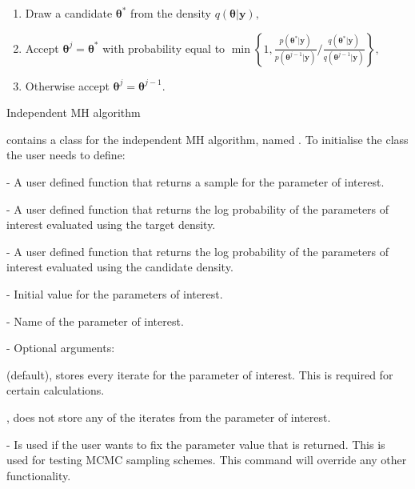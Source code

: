 \documentclass[article]{jss}
\begin{document}
%
\begin{algorithm}[H]
\begin{enumerate}
\item Draw a candidate $\bm{\bm{\theta}}^{\ast}$ from the density $q\left(\bm{\bm{\theta}}|\bm{y}\right),$ 
\item Accept $\bm{\theta}^{j}=\bm{\theta}^{\ast}$ with probability equal
to $\min\left\{ 1,\frac{p\left(\bm{\theta}^{\ast}|\bm{y}\right)}{p\left(\bm{\theta}^{j-1}|\bm{y}\right)}/\frac{q\left(\bm{\theta}^{\ast}|\bm{y}\right)}{q\left(\bm{\theta}^{j-1}|\bm{y}\right)}\right\} ,$ 
\item Otherwise accept $\bm{\theta}^{j}=\bm{\theta}^{j-1}.$ 
\end{enumerate}
\caption{Independent MH algorithm}
\label{alg:IMH}
\end{algorithm}


 contains a class for the independent MH algorithm, named
.  To initialise the class the user needs to define:
\begin{description}
\item {} - A user defined function that returns a sample for
  the parameter of interest.
\item {} - A user defined function that returns the log
  probability of the parameters of interest evaluated using the target
  density.
\item {} - A user defined function that returns the log
  probability of the parameters of interest evaluated using the
  candidate density.
\item {} - Initial value for the parameters of interest.
\item {} - Name of the parameter of interest.
\item {}- Optional arguments:

\begin{description}
\item {}
  \begin{description}
  \item {} (default), stores every iterate for the parameter
    of interest. This is required for certain calculations.
  \item {}, does not store any of the iterates from the parameter
    of interest.
  \end{description}
\item {} - Is used if the user wants to fix the
    parameter value that is returned. This is used for testing MCMC
    sampling schemes.  This command will override any other
    functionality.
  \end{description}
\end{description}
\end{document}
